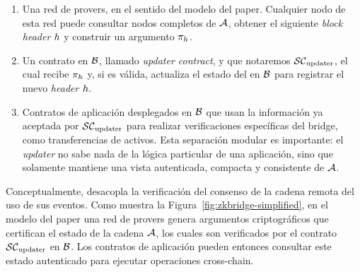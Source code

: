 \begin{enumerate}[noitemsep]
			\item Una red de provers, en el sentido del modelo del paper. Cualquier nodo de esta red puede consultar nodos completos de $\mathcal{A}$, obtener el siguiente \textit{block header} $h$ y construir un argumento \ZK $\pi_{h}$.
		\item Un contrato \Onchain en $\mathcal{B}$, llamado \emph{updater contract}, y que notaremos $\mathcal{SC}_{\mathrm{updater}}$, el cual recibe $\pi_{h}$ y, si es válida, actualiza el estado del \LightClient en $\mathcal{B}$ para registrar el nuevo \textit{header} $h$.
		\item Contratos de aplicación desplegados en $\mathcal{B}$ que usan la información ya aceptada por $\mathcal{SC}_{\mathrm{updater}}$ para realizar verificaciones específicas del bridge, como transferencias de activos. Esta separación modular es importante: el \textit{updater} no sabe nada de la lógica particular de una aplicación, sino que solamente mantiene una vista autenticada, compacta y consistente de $\mathcal{A}$.
\end{enumerate}

Conceptualmente, \zkBridge desacopla la verificación del consenso de la cadena remota del uso de sus eventos. Como muestra la Figura~\ref{fig:zkbridge-simplified}, en el modelo del paper una red de provers genera argumentos criptográficos que certifican el estado de la cadena  $\mathcal{A}$, los cuales son verificados por el contrato $\mathcal{SC}_{\mathrm{updater}}$ en $\mathcal{B}$. Los contratos de aplicación pueden entonces consultar este estado autenticado para ejecutar operaciones cross-chain.

